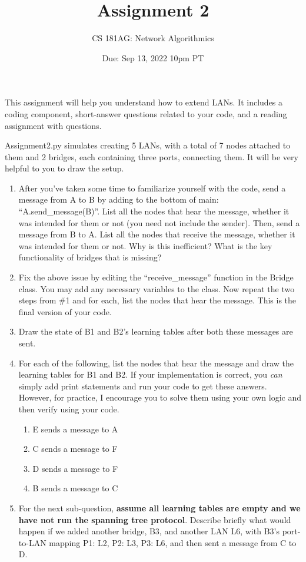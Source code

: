 \documentclass[10pt]{article}
\date{Due: Sep 13, 2022 10pm PT}
\newenvironment{problem}[2][Problem]{\begin{trivlist}
\item[\hskip \labelsep {\bfseries #1}\hskip \labelsep {\bfseries #2.}]}{\end{trivlist}}
\begin{document}
 
\title{Assignment 2}
\author{
CS 181AG: Network Algorithmics}
\maketitle

This assignment will help you understand how to extend LANs. It includes a coding component, short-answer questions related to your code, and a reading assignment with questions.  

 
\begin{problem}{1: Learning Bridges}
Assignment2.py simulates creating 5 LANs, with a total of 7 nodes attached to them and 2 bridges, each containing three ports,  connecting them. It will be very helpful to you to draw the setup.

\begin{enumerate}
    \item After you've taken some time to familiarize yourself with the code, send a message from A to B by adding to the bottom of main: ``A.send\_message(B)''. List all the nodes that hear the message, whether it was intended for them or not (you need not include the sender). Then, send a message from B to A. List all the nodes that receive the message, whether it was intended for them or not. Why is this inefficient? What is the key functionality of bridges that is missing?
    \item Fix the above issue by editing the ``receive\_message'' function in the Bridge class. You may add any necessary variables to the class. Now repeat the two steps from \#1 and for each, list the nodes that hear the message. This is the final version of your code.
    \item Draw the state of B1 and B2's learning tables after both these messages are sent. 
    \item For each of the following, list the nodes that hear the message and draw the learning tables for B1 and B2. If your implementation is correct, you \emph{can} simply add print statements and run your code to get these answers. However, for practice, I encourage you to solve them using your own logic and then verify using your code. 
    \begin{enumerate}
        \item E sends a message to A
        \item C sends a message to F
        \item D sends a message to F
        \item B sends a message to C
    \end{enumerate}
    
    \item For the next sub-question, \textbf{assume all learning tables are empty and we have not run the spanning tree protocol}. Describe briefly what would happen if we added another bridge, B3, and another LAN L6, with B3's port-to-LAN mapping {P1: L2, P2: L3, P3: L6}, and then sent a message from C to D.
\end{enumerate}
\end{problem}
\end{document}

